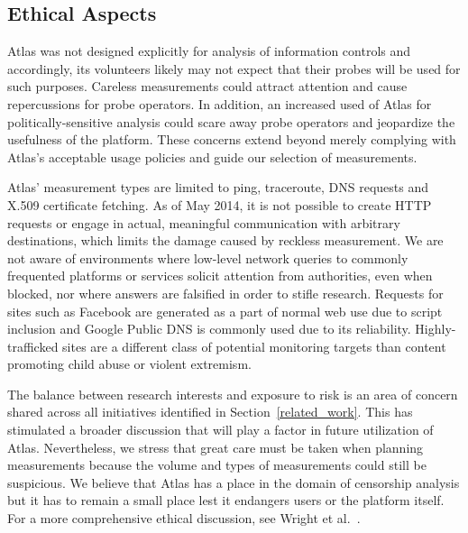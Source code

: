 \subsection{Ethical Aspects}

Atlas was not designed explicitly for analysis of information controls and accordingly, its
volunteers likely may not expect that their probes will be used for such
purposes.  Careless measurements could attract attention and cause
repercussions for probe operators.  In addition, an increased used of Atlas for
politically-sensitive analysis could scare away probe operators and jeopardize the
usefulness of the platform. These concerns extend beyond merely complying with Atlas's
acceptable usage policies and guide our selection of measurements.

Atlas' measurement types are limited to ping, traceroute, DNS requests and
X.509 certificate fetching.  As of May 2014, it is not possible to create HTTP
requests or engage in actual, meaningful communication with arbitrary
destinations, which limits the damage caused by reckless measurement. We
are not aware of environments where low-level network queries to commonly
frequented platforms or services solicit attention from authorities,
even when blocked, nor where answers are falsified in order to stifle
research. Requests for sites such as Facebook are generated as a part of
normal web use due to script inclusion and Google Public DNS is commonly
used due to its reliability. Highly-trafficked sites are a different
class of potential monitoring targets than content promoting child
abuse or violent extremism.

The balance between research interests and exposure to risk is an area of concern shared across all initiatives identified in Section~\ref{related_work}. This has stimulated a broader discussion that will play a factor in future utilization of Atlas. Nevertheless, we stress that great care must be taken when planning measurements because the volume and types of measurements could still be suspicious. We believe that Atlas has a place in the domain of censorship analysis but it has to remain a small place lest it endangers users or the platform itself. For a more comprehensive ethical discussion, see Wright et al.~\cite[\S~5]{Wright2011}.
